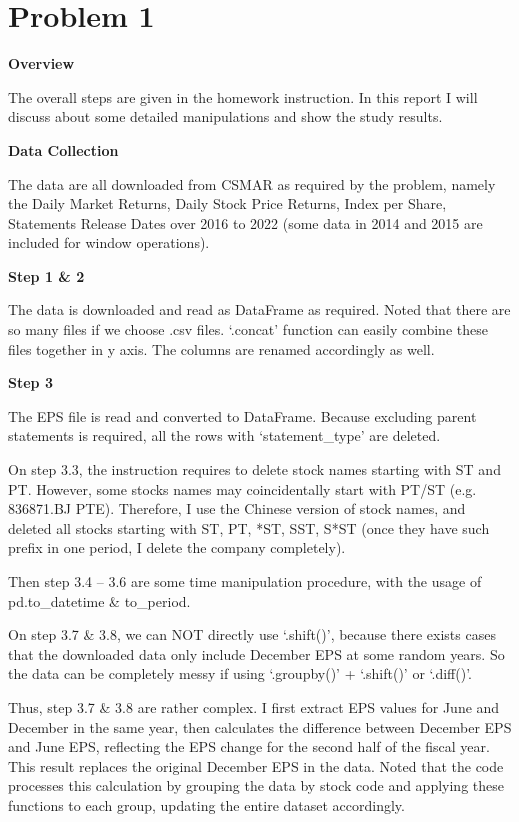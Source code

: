 
\section*{Problem 1}

\noindent
\textbf{Overview}

The overall steps are given in the homework instruction. In this report I will discuss about some detailed manipulations and show the study results.

\noindent
\textbf{Data Collection}

The data are all downloaded from CSMAR as required by the problem, namely the Daily Market Returns, Daily Stock Price Returns, Index per Share, Statements Release Dates over 2016 to 2022 (some data in 2014 and 2015 are included for window operations).



\noindent
\textbf{Step 1 \& 2} 

The data is downloaded and read as DataFrame as required. Noted that there are so many files if we choose .csv files. `.concat' function can easily combine these files together in y axis. The columns are renamed accordingly as well.


\noindent
\textbf{Step 3} 

The EPS file is read and converted to DataFrame. Because excluding parent statements is required, all the rows with `statement\_type' are deleted.

\begin{claimbox}
  On step 3.3, the instruction requires to delete stock names starting with ST and PT. However, some stocks names may coincidentally start with PT/ST (e.g. 836871.BJ PTE). Therefore, I use the Chinese version of stock names, and deleted all stocks starting with ST, PT, *ST, SST, S*ST (once they have such prefix in one period, I delete the company completely).
\end{claimbox}

Then step 3.4 -- 3.6 are some time manipulation procedure, with the usage of pd.to\_datetime \& to\_period. 

\begin{warningbox}
  On step 3.7 \& 3.8, we can NOT directly use `.shift()', because there exists cases that the downloaded data only include December EPS at some random years. So the data can be completely messy if using `.groupby()' + `.shift()' or `.diff()'.
\end{warningbox}

Thus, step 3.7 \& 3.8 are rather complex. I first extract EPS values for June and December in the same year, then calculates the difference between December EPS and June EPS, reflecting the EPS change for the second half of the fiscal year. This result replaces the original December EPS in the data. Noted that the code processes this calculation by grouping the data by stock code and applying these functions to each group, updating the entire dataset accordingly.

